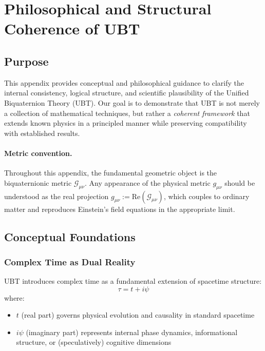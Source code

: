 
\section{Philosophical and Structural Coherence of UBT}
\label{app:philosophical_coherence}

\subsection{Purpose}

This appendix provides conceptual and philosophical guidance to clarify the internal consistency, logical structure, and scientific plausibility of the Unified Biquaternion Theory (UBT). Our goal is to demonstrate that UBT is not merely a collection of mathematical techniques, but rather a \emph{coherent framework} that extends known physics in a principled manner while preserving compatibility with established results.

\paragraph{Metric convention.} Throughout this appendix, the fundamental geometric object is the biquaternionic metric $\mathcal{G}_{\mu\nu}$. Any appearance of the physical metric $g_{\mu\nu}$ should be understood as the real projection $g_{\mu\nu} := \text{Re}(\mathcal{G}_{\mu\nu})$, which couples to ordinary matter and reproduces Einstein's field equations in the appropriate limit.

\subsection{Conceptual Foundations}

\subsubsection{Complex Time as Dual Reality}

UBT introduces complex time as a fundamental extension of spacetime structure:
\begin{equation}
\tau = t + i\psi
\end{equation}
where:
\begin{itemize}
\item $t$ (real part) governs physical evolution and causality in standard spacetime
\item $i\psi$ (imaginary part) represents internal phase dynamics, informational structure, or (speculatively) cognitive dimensions
\end{itemize}

